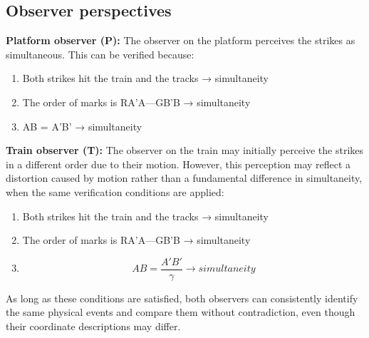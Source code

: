 \documentclass[pdflatex,sn-basic]{sn-jnl}
\theoremstyle{thmstyleone}%
\theoremstyle{thmstyletwo}%
\theoremstyle{thmstylethree}%
\begin{document}
	\subsection{Observer perspectives}\label{subsec2_4}
		\textbf{Platform observer (P):} The observer on the platform perceives the strikes as simultaneous. This can be verified because:
			\begin{enumerate}
				\item Both strikes hit the train and the tracks → simultaneity
				\item The order of marks is RA’A—GB'B → simultaneity
				\item AB = A'B' → simultaneity
			\end{enumerate}
		\textbf{Train observer (T):} The observer on the train may initially perceive the strikes in a different order due to their motion. However, this perception may reflect a distortion caused by motion rather than a fundamental difference in simultaneity, when the same verification conditions are applied:
			\begin{enumerate}
				\item Both strikes hit the train and the tracks → simultaneity
				\item The order of marks is RA’A—GB'B → simultaneity
				\item 
    					\begin{equation*}
  						AB=\frac{A'B'}{\gamma} \to simultaneity
    					\end{equation*}
			\end{enumerate}
	As long as these conditions are satisfied, both observers can consistently identify the same physical events and compare them without contradiction, even though their coordinate descriptions may differ.
	
\end{document}
